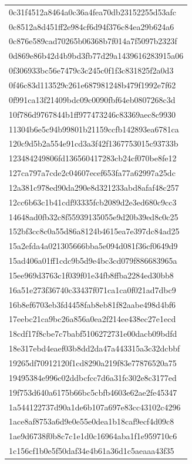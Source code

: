 \begin{tabular}{l}
0c31f4512a8464a0c36a4fea70db23152255d53afc \\
0c8512a8d451ff2e984cf6d94f376c84ea29b624a6 \\
0c876e589cad70265b06368b7f014a7f5097b2323f \\
0d869e86b42d4b9bd3fb77d29a1439616283915a06 \\
0f306933bc56e7479c3c245c0f1f3c831825f2a0d3 \\
0f46c83d113529c261e687981248b479f1992e7f62 \\
0f991ca13f21409bdc09c0090fbf64eb0807268c3d \\
10f786d9767844b1ff977473246c83369aec8c9930 \\
11304b6e5c94b99801b21159ccfb142893ea6781ca \\
120c9d5b2a554e91cd3a3f42f1367753015c93733b \\
123484249806fd136560417283cb24cf070be8fe12 \\
127ca797a7cde2c04607ecef653fa77a62997a25dc \\
12a381c978ed90da290e8d321233abd8afaf48c257 \\
12cc6b63c1b41cdf93335fcb2089d2e3ed680c9cc3 \\
14648ad0fb32c8f55939135055e9d20b39ed8c0c25 \\
152bf3cc8c0a55d86a8124b4615ea7e397dc84ad25 \\
15a2efda4a021305666bba5e094d081f36cf0649d9 \\
15ad406a01ff1cdc9b5d9e4bc3cd079f886683965a \\
15ee969d3763c1f039f01e34fb8ffba2284ed30bb8 \\
16a51e273f36740c33437f071ca1ca0f021ad7dbc9 \\
16b8ef6703eb3fd4458fab8eb81f82aabe498d4bf6 \\
17eebc21ca9bc26a856a0ea2f214ee438ec27e1ecd \\
18cdf17f8cbe7c7babf5106272731e00dacb09bdfd \\
18e317ebd4eaef03b8dd2da47a443315a3c32dcbbf \\
19265df70912120f1cd8290a219f83e77876520a75 \\
19495384e996c02ddbcfcc7d6a31fc302e8c3177ed \\
19f753d640a6175b66bc5cbfb4603e62ae2fe45347 \\
1a544122737d90a1de6b107a697e83cc43102c4296 \\
1ace8af8753a6d9e0e55e0dea1b18caf9ecf4d09c8 \\
1ae9d6738f0b8c7c1e1d0c16964aba1f1e959710c6 \\
1c156cf1b0e5f50daf34e4b61a36d1c5aeaaa43f35 \\

\end{tabular}
